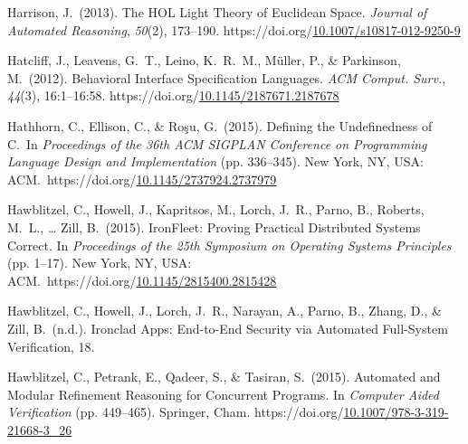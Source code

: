 \documentclass[12pt,twoside]{article}
\begin{document}
{\begin{thebibliography}{222}
\mdbibitemlabel{[Harrison, 2013]}Harrison, J.~(2013). The HOL Light Theory of Euclidean Space. \emph{Journal of Automated Reasoning}, \emph{50}(2), 173–190. https://doi.org/\href{https://dx.doi.org/10.1007/s10817-012-9250-9}{10.1007/s10817-012-9250-9}\label{harrison_hol_2013}%

Hatcliff, J., Leavens, G.~T., Leino, K.~R.~M., Müller, P., \& Parkinson, M.~(2012). Behavioral Interface Specification Languages. \emph{ACM Comput. Surv.}, \emph{44}(3), 16:1–16:58. https://doi.org/\href{https://dx.doi.org/10.1145/2187671.2187678}{10.1145/2187671.2187678}\label{hatcliff_behavioral_2012}%

Hathhorn, C., Ellison, C., \& Roşu, G.~(2015). Defining the Undefinedness of C.~In \emph{Proceedings of the 36th ACM SIGPLAN Conference on Programming Language Design and Implementation} (pp. 336–345). New York, NY, USA: ACM.~https://doi.org/\href{https://dx.doi.org/10.1145/2737924.2737979}{10.1145/2737924.2737979}\label{hathhorn_defining_2015}%

Hawblitzel, C., Howell, J., Kapritsos, M., Lorch, J.~R., Parno, B., Roberts, M.~L., … Zill, B.~(2015). IronFleet: Proving Practical Distributed Systems Correct. In \emph{Proceedings of the 25th Symposium on Operating Systems Principles} (pp. 1–17). New York, NY, USA: ACM.~https://doi.org/\href{https://dx.doi.org/10.1145/2815400.2815428}{10.1145/2815400.2815428}\label{hawblitzel_ironfleet:_2015}%

\mdbibitemlabel{[Hawblitzel et al., n.d.]}Hawblitzel, C., Howell, J., Lorch, J.~R., Narayan, A., Parno, B., Zhang, D., \& Zill, B.~(n.d.). Ironclad Apps: End-to-End Security via Automated Full-System Veriﬁcation, 18.\label{hawblitzel_ironclad_nodate}%

Hawblitzel, C., Petrank, E., Qadeer, S., \& Tasiran, S.~(2015). Automated and Modular Refinement Reasoning for Concurrent Programs. In \emph{Computer Aided Verification} (pp. 449–465). Springer, Cham. https://doi.org/\href{https://dx.doi.org/10.1007/978-3-319-21668-3_26}{10.1007/978-3-319-21668-3\_26}\label{hawblitzel_automated_2015}%


\end{thebibliography}}
\end{document}
